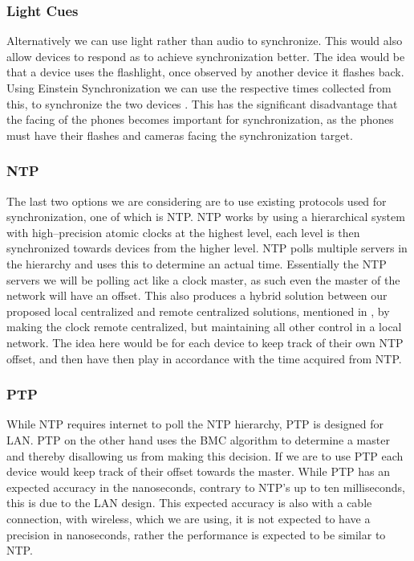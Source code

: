 \subsubsection{Light Cues}
Alternatively we can use light rather than audio to synchronize.
This would also allow devices to respond as to achieve synchronization better.
The idea would be that a device uses the flashlight, once observed by another device it flashes back.
Using Einstein Synchronization we can use the respective times collected from this, to synchronize the two devices \cite{einstein}.
This has the significant disadvantage that the facing of the phones becomes important for synchronization, as the phones must have their flashes and cameras facing the synchronization target.

\subsubsection{\acl{NTP}}
The last two options we are considering are to use existing protocols used for synchronization, one of which is \ac{NTP}.
\ac{NTP} works by using a hierarchical system with high--precision atomic clocks at the highest level, each level is then synchronized towards devices from the higher level.
\ac{NTP} polls multiple servers in the hierarchy and uses this to determine an actual time.
Essentially the \ac{NTP} servers we will be polling act like a clock master, as such even the master of the network will have an offset.
This also produces a hybrid solution between our proposed local centralized and remote centralized solutions, mentioned in , by making the clock remote centralized, but maintaining all other control in a local network.
The idea here would be for each device to keep track of their own \ac{NTP} offset, and then have then play in accordance with the time acquired from \ac{NTP}. 

\subsubsection{\acl{PTP}}
While \ac{NTP} requires internet to poll the \ac{NTP} hierarchy, \ac{PTP} is designed for LAN.
\ac{PTP} on the other hand uses the \ac{BMC} algorithm to determine a master and thereby disallowing us from making this decision.
If we are to use \ac{PTP} each device would keep track of their offset towards the master.
While \ac{PTP} has an expected accuracy in the nanoseconds, contrary to NTP's up to ten milliseconds, this is due to the LAN design.
This expected accuracy is also with a cable connection, with wireless, which we are using, it is not expected to have a precision in nanoseconds, rather the performance is expected to be similar to \ac{NTP}.

